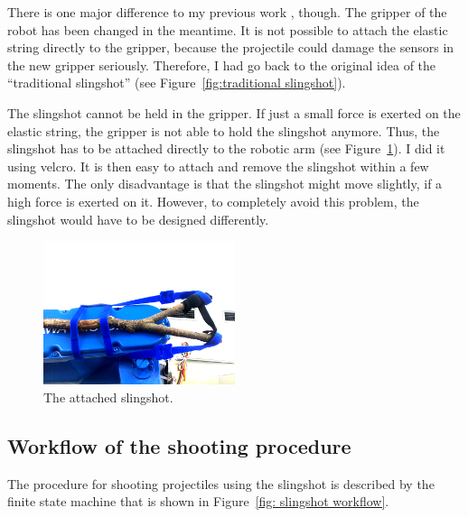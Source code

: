 There is one major difference to my previous work \cite{PreDiplomaLejsekHlavac}, though. The gripper of the \CloPeMa\/ robot has been changed in the meantime. It is not possible to attach the elastic string directly to the gripper, because the projectile could damage the sensors in the new gripper seriously. Therefore, I had go back to the original idea of the ``traditional slingshot'' (see Figure~\ref{fig:traditional slingshot}).

The slingshot cannot be held in the gripper. If just a small force is exerted on the elastic string, the gripper is not able to hold the slingshot anymore. Thus, the slingshot has to be attached directly to the robotic arm (see Figure~\ref{fig:attached slingshot}). I did it using velcro. It is then easy to attach and remove the slingshot within a few moments. The only disadvantage is that the slingshot might move slightly, if a high force is exerted on it. However, to completely avoid this problem, the slingshot would have to be designed differently.

			\begin{figure}[h]
			\includegraphics[width=0.5\textwidth]{attached_slingshotAdj.png}			
			\centering
			\caption{The attached slingshot.}
			\label{fig:attached slingshot}
			\end{figure}		
	
	
		\subsection{Workflow of the shooting procedure} \label{subsec: traditional workflow}
The procedure for shooting projectiles using the slingshot is described by the finite state machine that is shown in Figure~\ref{fig: slingshot workflow}.
			
